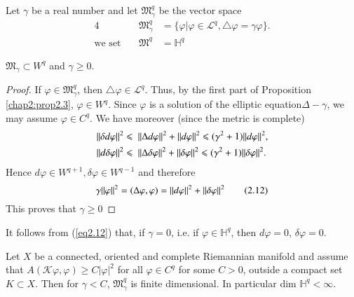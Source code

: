 Let $\gamma$ be a real number and let $\mathfrak{M}^q_\gamma$ be the vector space
\begin{alignat*}{4}
  &&\mathfrak{M}^q_\gamma & =\{\varphi|\varphi \in \mathcal{L}^q, \triangle
  \varphi = \gamma \varphi \}. \\
  \text {we set}~  & &\mathfrak{M}^q & =\mathbb{H}^q
\end{alignat*}

\begin{lemma}\label{chap2:lem2.5}%
  $\mathfrak{M}_\gamma \subset  W^q$ and $\gamma \geqslant 0$.
\end{lemma}

\begin{proof}
  If $\varphi \in \mathfrak{M}^q_\gamma$, then $\triangle \varphi \in
  \mathcal{L}^q$. Thus, by the first part of Proposition
  \ref{chap2:prop2.3}, $\varphi 
  \in W^q$. Since $\varphi$ is a solution of the elliptic 
  equation\pageoriginale $\Delta-\gamma$, we may assume $\varphi\in
  C^q$. We have  moreover (since the metric is complete) 
  \begin{align*}
    \Arrowvert\delta d \varphi \Arrowvert^2 & \leqslant\ \Arrowvert \Delta
    d \varphi \Arrowvert^2+ \Arrowvert d \varphi \Arrowvert^2 \leqslant
    (\gamma^2+1) \Arrowvert d \varphi \Arrowvert^2,\\ 
    \Arrowvert d \delta  \varphi \Arrowvert^2 & \leqslant\  \Arrowvert
    \Delta \delta \varphi \Arrowvert^2+ \Arrowvert \delta \varphi
    \Arrowvert^2 \leqslant (\gamma^2+1) \Arrowvert \delta \varphi
    \Arrowvert^2.
  \end{align*}
  Hence $d \varphi \in W^{q+1},\delta \varphi \in W^{q-1}$ and therefore
  \begin{equation*}
    \gamma \Arrowvert \varphi \Arrowvert^2= (\Delta \varphi,\varphi)=
    \Arrowvert d \varphi \Arrowvert^2+ \Arrowvert \delta \varphi
    \Arrowvert^2 \tag{2.12} \label{eq2.12} 
  \end{equation*}
  This proves that $\gamma \geqslant 0$
\end{proof}

It follows from (\ref{eq2.12}) that, if $\gamma=0$, i.e. if $\varphi \in
\mathbb{H}^q$, then $d\varphi = 0$, $\delta \varphi = 0$. 

\begin{theorem}\label{chap2:thm2.3}%
  Let $X$ be a connected, oriented and complete Riemannian
  manifold and assume that $A(\mathcal{K} \varphi,\varphi)\geqslant
  C|\varphi|^2$ for all $\varphi \in C^q$ 
  for some $C > 0$, outside a compact set $K \subset X$. Then for
  $\gamma < C$, $\mathfrak{M}^q_\gamma$ 
  is finite dimensional. In particular dim $\mathbb{H}^q < \infty$.
\end{theorem}

